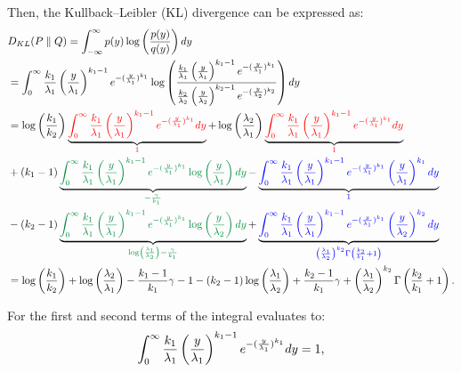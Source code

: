 Then, the Kullback–Leibler (KL) divergence can be expressed as:
{\small
\begin{align*}
&D_{KL}(P\parallel Q)=\int_{-\infty}^{\infty}p(y)\log\left(\frac{p(y)}{q(y)}\right)dy\\
&=\int_{0}^{\infty}\frac{k_1}{\lambda_1} \left(\frac{y}{\lambda_1}\right)^{k_1-1} e^{-(\frac{y}{\lambda_1})^{k_1}} \log\left(\frac{\frac{k_1}{\lambda_1} \left(\frac{y}{\lambda_1}\right)^{k_1-1} e^{-(\frac{y}{\lambda_1})^{k_1}}}{\frac{k_2}{\lambda_2} \left(\frac{y}{\lambda_2}\right)^{k_2-1} e^{-(\frac{y}{\lambda_2})^{k_2}}}\right)dy\\
&=\log\left(\frac{k_1}{k_2}\right)\underbrace{\textcolor{red}{\int_{0}^{\infty}\frac{k_1}{\lambda_1} \left(\frac{y}{\lambda_1}\right)^{k_1-1} e^{-(\frac{y}{\lambda_1})^{k_1}}dy}}_{\textcolor{red}{1}}+\log\left(\frac{\lambda_2}{\lambda_1}\right)\underbrace{\textcolor{red}{\int_{0}^{\infty}\frac{k_1}{\lambda_1} \left(\frac{y}{\lambda_1}\right)^{k_1-1} e^{-(\frac{y}{\lambda_1})^{k_1}}dy}}_{\textcolor{red}{1}}\\
&+(k_1-1)\underbrace{\textcolor{PowerPointGreen}{\int_{0}^{\infty}\frac{k_1}{\lambda_1} \left(\frac{y}{\lambda_1}\right)^{k_1-1} e^{-(\frac{y}{\lambda_1})^{k_1}}\log\left(\frac{y}{\lambda_1}\right) dy}}_{\textcolor{PowerPointGreen}{-\frac{\gamma}{k_1}}}-\underbrace{\textcolor{blue}{\int_{0}^{\infty}\frac{k_1}{\lambda_1} \left(\frac{y}{\lambda_1}\right)^{k_1-1} e^{-(\frac{y}{\lambda_1})^{k_1}}\left(\frac{y}{\lambda_1}\right)^{k_1} dy}}_{\textcolor{blue}{1}}\\
&-(k_2-1)\underbrace{\textcolor{PowerPointGreen}{\int_{0}^{\infty}\frac{k_1}{\lambda_1} \left(\frac{y}{\lambda_1}\right)^{k_1-1} e^{-(\frac{y}{\lambda_1})^{k_1}}\log\left(\frac{y}{\lambda_2}\right) dy}}_{\textcolor{PowerPointGreen}{\log\left(\frac{\lambda_1}{\lambda_2}\right)-\frac{\gamma}{k_1}}}+\underbrace{\textcolor{blue}{\int_{0}^{\infty}\frac{k_1}{\lambda_1} \left(\frac{y}{\lambda_1}\right)^{k_1-1} e^{-(\frac{y}{\lambda_1})^{k_1}}\left(\frac{y}{\lambda_2}\right)^{k_2} dy}}_{\textcolor{blue}{\left(\frac{\lambda_1}{\lambda_2}\right)^{k_2}\Gamma\left(\frac{k_2}{k_1}+1\right)}}\\
&=\log\left(\frac{k_1}{k_2}\right)+\log\left(\frac{\lambda_2}{\lambda_1}\right)-\frac{k_1-1}{k_1}\gamma-1-(k_2-1)\log\left(\frac{\lambda_1}{\lambda_2}\right)+\frac{k_2-1}{k_1}\gamma+\left(\frac{\lambda_1}{\lambda_2}\right)^{k_2}\Gamma\left(\frac{k_2}{k_1}+1\right).
\end{align*}
}

For the first and second terms of the integral evaluates to:
\begin{equation}\notag
\int_{0}^{\infty}\frac{k_1}{\lambda_1} \left(\frac{y}{\lambda_1}\right)^{k_1-1} e^{-(\frac{y}{\lambda_1})^{k_1}}dy=1,
\end{equation}


